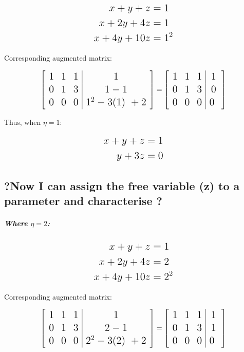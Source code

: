 \documentclass[
]{article}
\begin{document}
\[
\Large
\begin{aligned}
x + y + z &= 1 \\
x + 2y + 4z &= 1 \\
x + 4y + 10z &= 1^2
\end{aligned}
\]

Corresponding augmented matrix:

\[
\Large
\left[
\begin{array}{ccc|c}
1 & 1 & 1 & 1 \\
0 & 1 & 3 & 1-1 \\
0 & 0 & 0 & 1^2-3(1)\ + 2
\end{array}
\right]
\Large
= 
\left[
\begin{array}{ccc|c}
1 & 1 & 1 & 1 \\
0 & 1 & 3 & 0 \\
0 & 0 & 0 & 0\ 
\end{array}
\right]
\]

Thus, when \(\eta = 1\):

\[
\Large
\begin{aligned}
x + y + z &= 1 \\
y + 3z & = 0 \\
\end{aligned}
\]

\subsection{?Now I can assign the free variable (z) to a parameter and
characterise
?}\label{now-i-can-assign-the-free-variable-z-to-a-parameter-and-characterise}

\hfill\break
\hfill\break
\hfill\break

\subparagraph{\texorpdfstring{Where
\(\eta = 2\):}{Where \textbackslash eta = 2:}}\label{where-eta-2}

\[
\Large
\begin{aligned}
x + y + z &= 1 \\
x + 2y + 4z &= 2 \\
x + 4y + 10z &= 2^2
\end{aligned}
\]

Corresponding augmented matrix:

\[
\Large
\left[
\begin{array}{ccc|c}
1 & 1 & 1 & 1 \\
0 & 1 & 3 & 2-1 \\
0 & 0 & 0 & 2^2-3(2)\ + 2
\end{array}
\right]
\Large
= 
\left[
\begin{array}{ccc|c}
1 & 1 & 1 & 1 \\
0 & 1 & 3 & 1 \\
0 & 0 & 0 & 0\ 
\end{array}
\right]
\]
\end{document}
